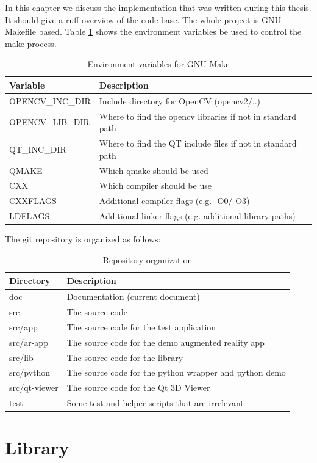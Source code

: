 \documentclass[11pt,a4paper,titlepage,oneside]{report}
\begin{document}
In this chapter we discuss the implementation that was written during this thesis. It should give a ruff overview of the code base. The whole project is GNU Makefile based. Table \ref{tab:envvars} shows the environment variables be used to control the make process.
\begin{table}[H]
  \centering
  \begin{tabular}{|l|l|}
    Variable & Description\\
    \hline
    OPENCV\_INC\_DIR & Include directory for OpenCV (opencv2/..)\\
    OPENCV\_LIB\_DIR & Where to find the opencv libraries if not in standard path\\
    QT\_INC\_DIR & Where to find the QT include files if not in standard path\\
    QMAKE & Which qmake should be used\\
    CXX & Which compiler should be use\\
    CXXFLAGS & Additional compiler flags (e.g. -O0/-O3)\\
    LDFLAGS & Additional linker flags (e.g.  additional library paths)
  \end{tabular}
\caption{Environment variables for GNU Make}
\label{tab:envvars}
\end{table}

The git repository is organized as follows:
\begin{table}[H]
  \centering
  \begin{tabular}{|l|l|}
    Directory & Description\\
    \hline
    doc & Documentation (current document)\\
    src  & The source code\\
    src/app & The source code for the test application\\
    src/ar-app & The source code for the demo augmented reality app\\
    src/lib & The source code for the library\\
    src/python & The source code for the python wrapper and python demo\\
    src/qt-viewer & The source code for the Qt 3D Viewer\\
    test & Some test and helper scripts that are irrelevant
  \end{tabular}
\caption{Repository organization}
\label{tab:organization}
\end{table}


\section{Library}
\end{document}

